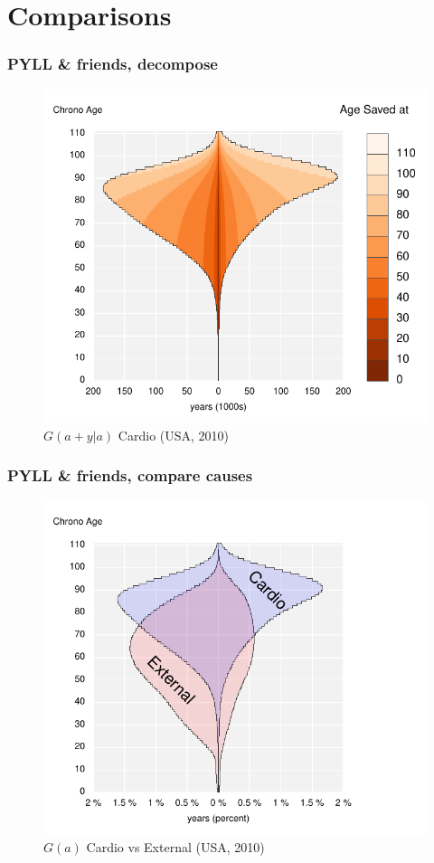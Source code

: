 \documentclass{beamer}
\begin{document}
\section{Comparisons}

\begin{frame}
\frametitle{PYLL \& friends, decompose}
\vspace{-1cm}
\begin{figure}[b]
    \centering
    \includegraphics[scale=.7]{Figures/f9_AgesWoncdec.pdf}
    \caption{$G(a+y|a)$ Cardio (USA, 2010)}
\end{figure} 
\end{frame}

\begin{frame}
\frametitle{PYLL \& friends, compare causes}
\vspace{-1cm}
\begin{figure}[b]
    \centering
    \includegraphics[scale=.7]{Figures/f11_AgesWoncomp.pdf}
    \caption{$G(a)$ Cardio vs External (USA, 2010)}
\end{figure} 
\end{frame}
\end{document}
